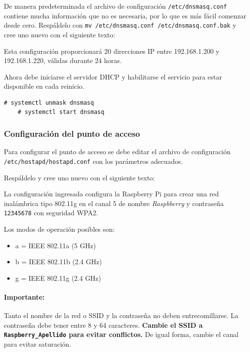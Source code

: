 \documentclass[letterpaper,10.5pt]{article}
\begin{document}
De manera predeterminada el archivo de configuración \texttt{/etc/dnsmasq.conf} contiene mucha información que no es necesaria, por lo que es más fácil comenzar desde cero.
Respáldelo con \texttt{mv /etc/dnsmasq.conf /etc/dnsmasq.conf.bak} y cree uno nuevo con el siguiente texto:


Esta configuración proporcionará 20 direcciones IP entre 192.168.1.200 y 192.168.1.220, válidas durante 24 horas.

Ahora debe iniciarse el servidor DHCP y habilitarse el servicio para estar disponible en cada reinicio.

\begin{Verbatim}[gobble=1,commentchar=\%]
	# systemctl unmask dnsmasq
	# systemctl start dnsmasq
\end{Verbatim}



\subsubsection{Configuración del punto de acceso}%
\label{sec:ap-hotspot}
Para configurar el punto de acceso se debe editar el archivo de configuración \texttt{/etc/hostapd/hostapd.conf} con los parámetros adecuados.

Respáldelo y cree uno nuevo con el siguiente texto:


La configuración ingresada configura la Raspberry Pi para crear una red inalámbrica tipo 802.11g en el canal 5 de nombre \emph{Raspbberry} y contraseña \texttt{12345678} con seguridad WPA2.

Los modos de operación posibles son:
\begin{itemize}[nosep]
\item a = IEEE 802.11a (5 GHz)
\item b = IEEE 802.11b (2.4 GHz)
\item g = IEEE 802.11g (2.4 GHz)
\end{itemize}

\paragraph*{Importante:} Tanto el nombre de la red o SSID y la contraseña no deben entrecomillarse. La contraseña debe tener entre 8 y 64 caracteres.
\textbf{Cambie el SSID a \texttt{Raspberry\_Apellido} para evitar conflictos.}
De igual forma, cambie el canal para evitar saturación.
\medskip
\end{document}
